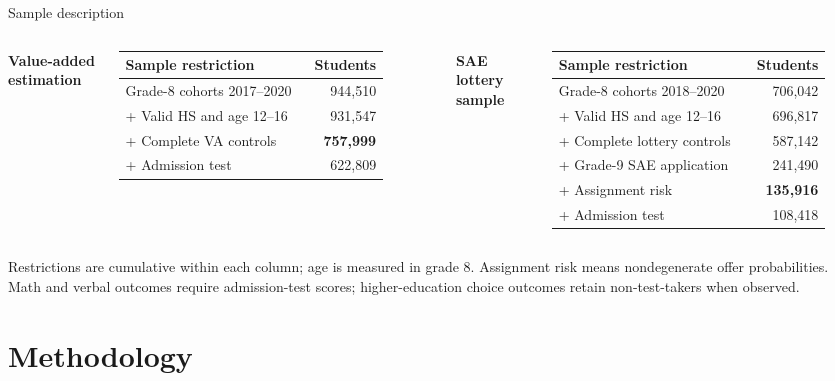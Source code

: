 \documentclass[11pt,aspectratio=169]{beamer}
\newcommand{\key}[1]{\textcolor{mDarkTeal}{\textbf{#1}}}
\begin{document}
\begin{frame}{Sample description}
\centering
\small
\begin{columns}[T,onlytextwidth]
  \centering
  {\bfseries Value-added estimation}\par
  \vspace{0.5em}
  \begin{tabular}{@{}p{0.68\linewidth}r@{}}
    \toprule
    Sample restriction & Students \\
    \midrule
    Grade-8 cohorts 2017--2020 & 944,510 \\
    + Valid HS and age 12--16 & 931,547 \\
    + Complete VA controls & \key{757,999} \\
    + Admission test & 622,809 \\
    \bottomrule
  \end{tabular}

  \centering
  {\bfseries SAE lottery sample}\par
  \vspace{0.5em}
  \begin{tabular}{@{}p{0.68\linewidth}r@{}}
    \toprule
    Sample restriction & Students \\
    \midrule
    Grade-8 cohorts 2018--2020 & 706,042 \\
    + Valid HS and age 12--16 & 696,817 \\
    + Complete lottery controls & 587,142 \\
    + Grade-9 SAE application & 241,490 \\
    + Assignment risk & \key{135,916} \\
    + Admission test & 108,418 \\
    \bottomrule
  \end{tabular}
\end{columns}
\vspace{0.8em}
\begin{minipage}{\textwidth}
\footnotesize
Restrictions are cumulative within each column; age is measured in grade 8.
Assignment risk means nondegenerate offer probabilities.\\[0.35em]
Math and verbal outcomes require admission-test scores; higher-education choice outcomes retain non-test-takers when observed.
\end{minipage}
\end{frame}

\section{Methodology}
\end{document}
